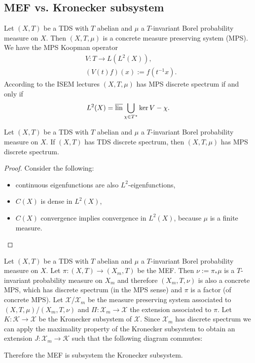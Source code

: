 \subsection{MEF vs. Kronecker subsystem}
Let $(X,T)$ be a TDS with $T$ abelian and $\mu$ a $T$-invariant Borel probability measure on $X$.
Then $(X,T,\mu)$ is a concrete measure preserving system (MPS).
We have the MPS Koopman operator
\begin{equation*}
  \begin{split}
    &V : T \to L(L^2(X)),\\
    & (V(t) f)(x) := f (t^{-1} x). 
  \end{split}
\end{equation*}
According to the ISEM lectures
  $(X,T,\mu)$ has MPS discrete spectrum if and only if
  \begin{equation*}
    L^2(X) = \overline{\operatorname{lin}} \bigcup_{\chi \in T^*} \ker V - \chi.
  \end{equation*}
  \begin{proposition}
    Let $(X,T)$ be a TDS with $T$ abelian and $\mu$ a $T$-invariant Borel probability measure on $X$.
  If $(X,T)$ has TDS discrete spectrum, then $(X,T,\mu)$ has MPS discrete spectrum.
  \end{proposition}
  \begin{proof}
    Consider the following:
  \begin{itemize}
    \item continuous eigenfunctions are also $L^2$-eigenfunctions,
    \item $C(X)$ is dense in $L^2(X)$,
    \item $C(X)$ convergence implies convergence in $L^2(X)$, because $\mu$ is a finite measure.
  \end{itemize}
  \end{proof}
  Let $(X,T)$ be a TDS with $T$ abelian and $\mu$ a $T$-invariant Borel probability measure on $X$.
    Let $\pi : (X,T) \to (X_m,T)$ be the MEF.
  Then $\nu:= \pi_* \mu$ is a $T$-invariant probability measure on $X_m$ and therefore $(X_m,T,\nu)$ is also a concrete MPS, which has discrete spectrum (in the MPS sense) and $\pi$ is a factor (of concrete MPS).
  Let $\mathcal{X}$/$\mathcal{X}_m$ be the measure preserving system associated to $(X,T,\mu)$/$(X_m,T,\nu)$ and $\Pi: \mathcal{X}_m \to \mathcal{X}$ the extension associated to $\pi$.
  Let $K: \mathcal{K} \to \mathcal{X}$ be the Kronecker subsystem of $\mathcal{X}$.
  Since $\mathcal{X}_m$ has discrete spectrum we can apply the maximality property of the Kronecker subsystem to obtain an extension $J: \mathcal{X}_m \to \mathcal{K}$ such that the following diagram commutes:
  \begin{center}
  \end{center}
  Therefore the MEF is subsystem the Kronecker subsystem.

